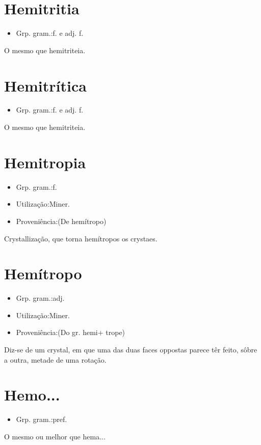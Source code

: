 \documentclass{article}
\begin{document}
\section{Hemitritia}
\begin{itemize}
\item {Grp. gram.:f.  e  adj. f.}
\end{itemize}
O mesmo que \textunderscore hemitriteia\textunderscore .
\section{Hemitrítica}
\begin{itemize}
\item {Grp. gram.:f.  e  adj. f.}
\end{itemize}
O mesmo que \textunderscore hemitriteia\textunderscore .
\section{Hemitropia}
\begin{itemize}
\item {Grp. gram.:f.}
\end{itemize}
\begin{itemize}
\item {Utilização:Miner.}
\end{itemize}
\begin{itemize}
\item {Proveniência:(De \textunderscore hemítropo\textunderscore )}
\end{itemize}
Crystallização, que torna hemítropos os crystaes.
\section{Hemítropo}
\begin{itemize}
\item {Grp. gram.:adj.}
\end{itemize}
\begin{itemize}
\item {Utilização:Miner.}
\end{itemize}
\begin{itemize}
\item {Proveniência:(Do gr. \textunderscore hemi\textunderscore  + \textunderscore trope\textunderscore )}
\end{itemize}
Diz-se de um crystal, em que uma das duas faces oppostas parece têr feito, sôbre a outra, metade de uma rotação.
\section{Hemo...}
\begin{itemize}
\item {Grp. gram.:pref.}
\end{itemize}
O mesmo ou melhor que \textunderscore hema...\textunderscore 
\end{document}

